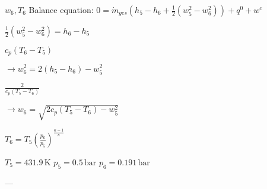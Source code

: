 \( w_6, T_6 \)  
Balance equation:  
\( 0 = \dot{m}_{ges} (h_5 - h_6 + \frac{1}{2} (w_5^2 - w_6^2)) + q^0 + w^c \)  

\( \frac{1}{2} (w_5^2 - w_6^2) = h_6 - h_5 \)  

\( c_p (T_6 - T_5) \)  

\( \rightarrow w_6^2 = 2 (h_5 - h_6) - w_5^2 \)  

\( \frac{2}{c_p (T_5 - T_6)} \)  

\( \rightarrow w_6 = \sqrt{2 c_p (T_5 - T_6) - w_5^2} \)  

\( T_6 = T_5 \left(\frac{p_6}{p_5}\right)^{\frac{\kappa - 1}{\kappa}} \)  

\( T_5 = 431.9 \, \text{K} \)  
\( p_5 = 0.5 \, \text{bar} \)  
\( p_6 = 0.191 \, \text{bar} \)  

---